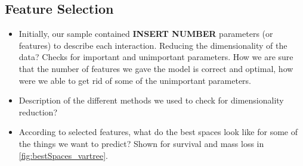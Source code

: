 \documentclass[fleqn,usenatbib]{mnras}
\begin{document}
\subsection{Feature Selection}
\label{sec:feature selection} %
\begin{itemize}
    \item Initially, our sample contained \textbf{INSERT NUMBER} parameters (or features) to describe each interaction. Reducing the dimensionality of the data? Checks for important and unimportant parameters. How we are sure that the number of features we gave the model is correct and optimal, how were we able to get rid of some of the unimportant parameters. 
    \item Description of the different methods we used to check for dimensionality reduction?
    \item According to selected features, what do the best spaces look like for some of the things we want to predict? Shown for survival and mass loss in \ref{fig:bestSpaces_vartree}.
\end{itemize}
\end{document}
